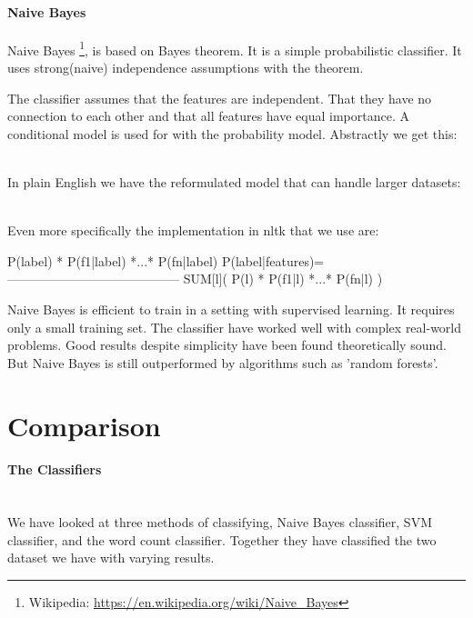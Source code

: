 \paragraph{Naive Bayes}\label{sentiment:naive_bayes_classification}
Naive Bayes \footnote{Wikipedia:
\url{https://en.wikipedia.org/wiki/Naive_Bayes}}, is based on Bayes theorem. It
is a simple probabilistic classifier. It uses strong(naive) independence
assumptions with the theorem.

The classifier assumes that the features are independent. That they have no
connection to each other and that all features have equal importance. 
A conditional model is used for with the probability model. Abstractly we get
this: 

\\

In plain English we have the reformulated model that can handle larger datasets:

\\

Even more specifically the implementation in nltk that we use are: 
\begin{python}
                   P(label) * P(f1|label) *...* P(fn|label)
P(label|features)=-----------------------------------------
                   SUM[l]( P(l) * P(f1|l) *...* P(fn|l) )
\end{python}

Naive Bayes is efficient to train in a setting with supervised
learning. It requires only a small training set. The classifier have worked well
with complex real-world problems. Good results despite simplicity have been
found theoretically sound. But Naive Bayes is still outperformed by algorithms
such as 'random forests'.
%

\section{Comparison}\label{sentiment:comparison_results}
\paragraph{The Classifiers}
\hspace{0pt}\\
We have looked at three methods of classifying, Naive Bayes classifier, SVM
classifier, and the word count classifier.
Together they have classified the two dataset we have with varying results. 

